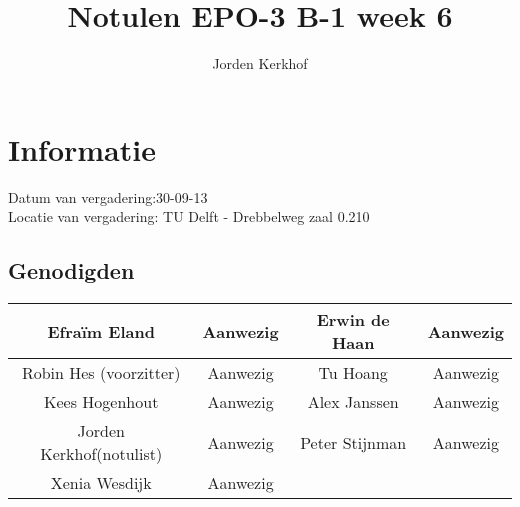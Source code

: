 \documentclass{article}
\begin{document}
\title{Notulen EPO-3 B-1 week 6 }%
\author{Jorden Kerkhof}%
\maketitle

\section*{Informatie}
Datum van vergadering:30-09-13 \\ %
Locatie van vergadering: TU Delft - Drebbelweg zaal 0.210 %
\subsection*{Genodigden}
\begin{center}
\begin{tabular}{|c |c | c| c|}
	\hline
Efraïm Eland  & Aanwezig & Erwin de Haan & Aanwezig \\
	\hline
Robin Hes (voorzitter) & Aanwezig & Tu Hoang & Aanwezig \\
	\hline
Kees Hogenhout & Aanwezig & Alex Janssen & Aanwezig\\
	\hline
Jorden Kerkhof(notulist) & Aanwezig & Peter Stijnman & Aanwezig \\
	\hline
Xenia Wesdijk & Aanwezig & & \\
	\hline
\end{tabular}
\end{center}
\end{document}
